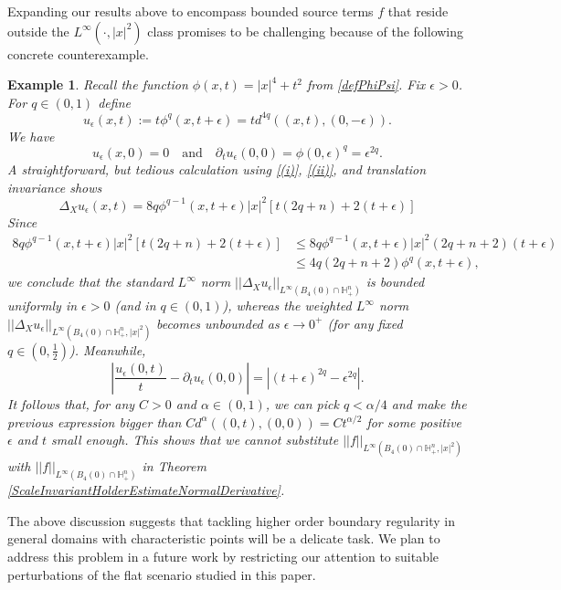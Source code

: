 \documentclass[12pt]{amsart}
\newtheorem{Example}[Theorem]{Example}
\def \H {{\mathbb H}}
\def \e {\epsilon}
\def \a {\alpha}
\begin{document}
Expanding our results above to encompass bounded source terms $f$ that reside outside the $L^{\infty}(\cdot,|x|^2)$ class promises to be challenging because of the following concrete counterexample.
\begin{Example}\label{example}
Recall the function $\phi(x,t) = |x|^4 + t^2$ from \eqref{defPhiPsi}. Fix $\e> 0$. For $q \in (0,1)$ define
\[u_{\e}(x,t) := t \phi^q(x,t+\e)  = t d^{4q}((x,t), (0,-\e)).\]
We have
\[u_{\e}(x,0) = 0 \quad \text{and} \quad \partial_t u_{\e}(0,0) = \phi(0,\e)^q =\e^{2q}.
\]
A straightforward, but tedious calculation using \eqref{(i)}, \eqref{(ii)}, and translation invariance shows
\[\Delta_X u_{\e}(x,t) = 8 q\phi^{q-1}(x,t+\e) |x|^2 \left[t (2q+n) +2(t+\e)\right]\]
Since
\begin{align*}
8 q\phi^{q-1}(x,t+\e) |x|^2 \left[t (2q+n) +2(t+\e)\right] & \leq 8 q\phi^{q-1}(x,t+\e) |x|^2 (2q+n+2)(t+\e) \\
& \leq 4q(2q+n+2) \phi^q(x,t+\e),
\end{align*}
we conclude that the standard $L^{\infty}$ norm $||\Delta_X u_{\e}||_{L^{\infty}(B_4(0)\cap\H^n_+)}$ is bounded uniformly in $\e>0$ (and in $q\in (0,1)$), whereas the weighted $L^{\infty}$ norm $||\Delta_X u_{\e}||_{L^{\infty}(B_4(0)\cap\H^n_+, |x|^2)}$ becomes unbounded as $\e \to 0^+$ (for any fixed $q\in (0,\frac{1}{2})$).
Meanwhile,
\[
\left|\frac{u_{\e}(0,t)}{t}-\partial_t u_{\e}(0,0)\right| = |(t+\e)^{2q} - \e^{2q}|.
\]
It follows that, for any $C>0$ and $\a\in (0,1)$, we can pick $q < \a/4$ and make the previous expression bigger than $C d^{\a}((0,t),(0,0))=C t^{\a/2}$ for some positive $\e$ and $t$ small enough. This shows that we cannot substitute $||f||_{L^{\infty}(B_{4}(0)\cap \H^n_+,|x|^{2})}$ with $||f||_{L^{\infty}(B_{4}(0)\cap \H^n_+)}$ in Theorem \ref{ScaleInvariantHolderEstimateNormalDerivative}.
\end{Example}

The above discussion suggests that tackling higher order boundary regularity in general domains with characteristic points will be a delicate task. We plan to address this problem in a future work by restricting our attention to suitable perturbations of the flat scenario studied in this paper.





\end{document}

